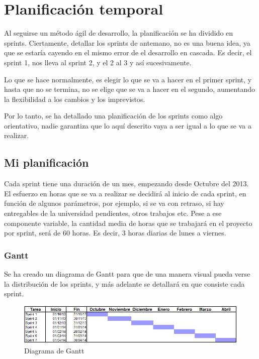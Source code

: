 \section{Planificaci\'{o}n temporal}
Al seguirse un m\'etodo \'agil de desarrollo, la planificaci\'on se ha
dividido en sprints. Ciertamente, detallar los sprints de antemano,
no es una buena idea, ya que se estar\'ia cayendo en el mismo error de el desarrollo
en cascada. Es decir, el sprint 1, nos lleva al sprint 2, y el 2 al 3 y as\'i sucesivamente.

Lo que se hace normalmente, es elegir lo que se va a hacer en el primer sprint, y hasta
que no se termina, no se elige que se va a hacer en el segundo, aumentando la flexibilidad a 
los cambios y los imprevistos.

Por lo tanto, se ha detallado una planificaci\'on de los sprints como algo orientativo,
nadie garantiza que lo aqu\'i descrito vaya a ser igual a lo que se va a realizar.

\subsection{Mi planificaci\'{o}n}
Cada sprint tiene una duraci\'{o}n de un mes, empezando desde Octubre del 2013. 
El esfuerzo en horas que se va a 
realizar se decidir\'a al inicio de cada sprint, en funci\'on de algunos par\'ametros, por ejemplo, si se va con retraso,
si hay entregables de la universidad pendientes, otros trabajos etc. Pese a ese componente variable, la cantidad
media de horas que se trabajar\'a en el proyecto por sprint, ser\'a de 60 horas. Es decir, 3 horas diarias de lunes a viernes.

\subsubsection{Gantt}
Se ha creado un diagrama de Gantt para que de una manera visual pueda
verse la distribuci\'on de los sprints, y m\'as adelante se detallar\'a
en que consiste cada sprint.

\begin{figure}[h]
\centering
\includegraphics[width=0.9\linewidth]{./Figures/Gantt.PNG}
\caption[Diagrama de Gantt]{Diagrama de Gantt}
\label{fig:Gantt}
\end{figure}

